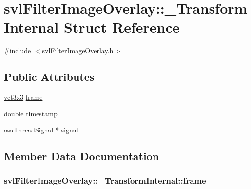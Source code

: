 \hypertarget{structsvl_filter_image_overlay_1_1___transform_internal}{}\section{svl\+Filter\+Image\+Overlay\+:\+:\+\_\+\+Transform\+Internal Struct Reference}
\label{structsvl_filter_image_overlay_1_1___transform_internal}


{\ttfamily \#include $<$svl\+Filter\+Image\+Overlay.\+h$>$}

\subsection*{Public Attributes}
\begin{DoxyCompactItemize}
\item 
\hyperlink{vct_fixed_size_matrix_types_8h_aac4a419dacf9282410675d42ebc86a7c}{vct3x3} \hyperlink{structsvl_filter_image_overlay_1_1___transform_internal_a787852544228904e7cd3dfe152e0c8b5}{frame}
\item 
double \hyperlink{structsvl_filter_image_overlay_1_1___transform_internal_ae2a07acc677c86f82241a0c8594818c4}{timestamp}
\item 
\hyperlink{classosa_thread_signal}{osa\+Thread\+Signal} $\ast$ \hyperlink{structsvl_filter_image_overlay_1_1___transform_internal_a572ad98ec052cca3dc92321d7669c4e6}{signal}
\end{DoxyCompactItemize}


\subsection{Member Data Documentation}
\hypertarget{structsvl_filter_image_overlay_1_1___transform_internal_a787852544228904e7cd3dfe152e0c8b5}{}
\subsubsection[{frame}]{ svl\+Filter\+Image\+Overlay\+::\+\_\+\+Transform\+Internal\+::frame}\label{structsvl_filter_image_overlay_1_1___transform_internal_a787852544228904e7cd3dfe152e0c8b5}
\hypertarget{structsvl_filter_image_overlay_1_1___transform_internal_a572ad98ec052cca3dc92321d7669c4e6}{}
